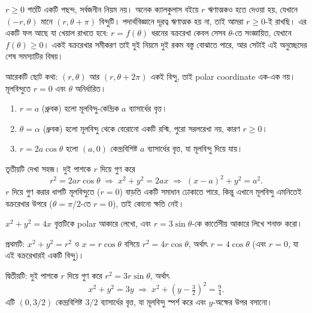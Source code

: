 \documentclass[11pt]{article}
\begin{document}
\begin{remark}
$r \geq 0$ শর্তটি একটি পছন্দ, সর্বজনীন নিয়ম নয়। অনেক ক্যালকুলাস বইয়ে $r$
ঋণাত্মকও হতে দেওয়া হয়, যেখানে $(-r, \theta)$ মানে $(r, \theta+\pi)$ বিন্দুটি।
পদার্থবিজ্ঞানে দূরত্ব ঋণাত্মক হয় না, তাই আমরা $r \geq 0$-ই রাখছি। এর একটি
ফল আছে যা খেয়াল রাখতে হবে: $r = f(\theta)$ ধরনের বক্ররেখা কেবল সেসব $\theta$-তে
সংজ্ঞায়িত, যেখানে $f(\theta) \geq 0$। একই বক্ররেখার সমীকরণ তাই দুই নিয়মে দুই
রকম বস্তু বোঝাতে পারে, আর সেটাই এই অনুচ্ছেদের শেষ সমস্যাটির বিষয়।

আরেকটি ছোট কথা: $(r,\theta)$ আর $(r, \theta + 2\pi)$ একই বিন্দু, তাই polar
coordinate এক-এক নয়। মূলবিন্দুতে $r = 0$ এবং $\theta$ অনির্ধারিত।
\end{remark}

\begin{idea}[কয়েকটি চেনা বক্ররেখা]
\begin{enumerate}
  \item $r = a$ (ধ্রুবক) হলো মূলবিন্দু-কেন্দ্রিক $a$ ব্যাসার্ধের বৃত্ত।
  \item $\theta = \alpha$ (ধ্রুবক) হলো মূলবিন্দু থেকে বেরোনো একটি রশ্মি, পুরো
        সরলরেখা নয়, কারণ $r \geq 0$।
  \item $r = 2a\cos\theta$ হলো $(a, 0)$ কেন্দ্রবিশিষ্ট $a$ ব্যাসার্ধের বৃত্ত,
        যা মূলবিন্দু দিয়ে যায়।
\end{enumerate}
\end{idea}

তৃতীয়টি দেখা সহজ। দুই পাশকে $r$ দিয়ে গুণ করে
\[
  r^{2} = 2ar\cos\theta
  \;\Longrightarrow\; x^{2}+y^{2} = 2ax
  \;\Longrightarrow\; (x-a)^{2} + y^{2} = a^{2} .
\]
$r$ দিয়ে গুণ করার ধাপটি মূলবিন্দুতে ($r=0$) বাড়তি একটি সমাধান ঢোকাতে পারে,
কিন্তু এখানে মূলবিন্দু এমনিতেই বক্ররেখার উপরে ($\theta = \pi/2$-তে $r=0$), তাই
কোনো ক্ষতি নেই।

\begin{example}
$x^{2}+y^{2} = 4x$ বৃত্তটিকে polar আকারে লেখো, এবং $r = 3\sin\theta$-কে
কার্তেসীয় আকারে লিখে শনাক্ত করো।
\end{example}

\begin{solbox}
প্রথমটি: $x^{2}+y^{2} = r^{2}$ ও $x = r\cos\theta$ বসিয়ে
$r^{2} = 4r\cos\theta$, অর্থাৎ $r = 4\cos\theta$ (এবং $r=0$, যা এই বক্ররেখারই
একটি বিন্দু)।

দ্বিতীয়টি: দুই পাশকে $r$ দিয়ে গুণ করে $r^{2} = 3r\sin\theta$, অর্থাৎ
\[
  x^{2}+y^{2} = 3y
  \;\Longrightarrow\; x^{2} + \left( y - \tfrac{3}{2} \right)^{2} = \tfrac{9}{4} .
\]
এটি $(0, 3/2)$ কেন্দ্রবিশিষ্ট $3/2$ ব্যাসার্ধের বৃত্ত, যা মূলবিন্দু স্পর্শ করে
এবং $y$-অক্ষের উপর বসানো।
\end{solbox}
\end{document}
